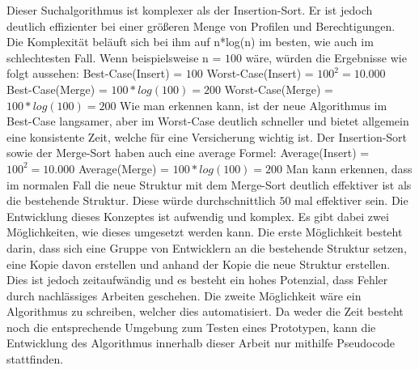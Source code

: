Dieser Suchalgorithmus ist komplexer als der Insertion-Sort. Er ist jedoch deutlich effizienter bei einer größeren Menge von Profilen und Berechtigungen.
Die Komplexität beläuft sich bei ihm auf n*log(n) im besten, wie auch im schlechtesten Fall. \cite{log, S.12, weblogMer} 
\newline
Wenn beispielsweise n = $100$ wäre, würden die Ergebnisse wie folgt aussehen:
\newline
\newline
Best-Case(Insert) = $100$
\newline
Worst-Case(Insert) = $100^2 = 10.000$
\newline
\newline
Best-Case(Merge) = $100*log(100) = 200$
\newline
Worst-Case(Merge) = $100*log(100) = 200$
\newline
\newline
Wie man erkennen kann, ist der neue Algorithmus im Best-Case langsamer, aber im Worst-Case deutlich schneller und bietet allgemein eine konsistente Zeit, welche für eine Versicherung wichtig ist.
Der Insertion-Sort sowie der Merge-Sort haben auch eine average Formel: \cite{weblogMer,weblogIn}
\newline
\newline
Average(Insert) = $100^2 = 10.000$
\newline
\newline
Average(Merge) = $100*log(100) = 200$
\newline
\newline
Man kann erkennen, dass im normalen Fall die neue Struktur mit dem Merge-Sort deutlich effektiver ist als die bestehende Struktur.
Diese würde durchschnittlich $50$ mal effektiver sein.
\newline
\newline
Die Entwicklung dieses Konzeptes ist aufwendig und komplex.
Es gibt dabei zwei Möglichkeiten, wie dieses umgesetzt werden kann.
Die erste Möglichkeit besteht darin, dass sich eine Gruppe von Entwicklern an die bestehende Struktur setzen, eine Kopie davon erstellen und anhand der Kopie die neue Struktur erstellen.
Dies ist jedoch zeitaufwändig und es besteht ein hohes Potenzial, dass Fehler durch nachlässiges Arbeiten geschehen.
\newline
Die zweite Möglichkeit wäre ein Algorithmus zu schreiben, welcher dies automatisiert.
Da weder die Zeit besteht noch die entsprechende Umgebung zum Testen eines Prototypen, kann die Entwicklung des Algorithmus innerhalb dieser Arbeit nur mithilfe Pseudocode stattfinden.
